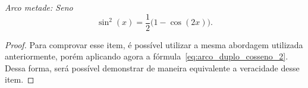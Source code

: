 \emph{Arco metade: Seno}
\begin{equation}
  \label{eq:arco_metade_sseno}
  \sin^2(x)= \frac{1}{2}\big(1-\cos(2x)\big).
\end{equation}

\begin{proof}
  Para comprovar esse item, é possível utilizar a mesma abordagem
  utilizada anteriormente, porém aplicando agora a
  fórmula~\eqref{eq:arco_duplo_cosseno_2}.
  Dessa forma, será possível demonstrar de maneira
  equivalente a veracidade desse item.
\end{proof}

